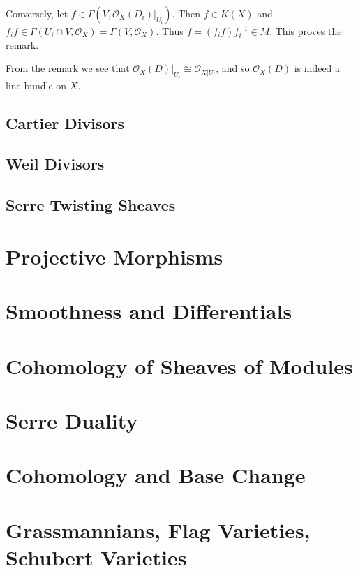 \documentclass[12pt]{book}
\theoremstyle{definition}
\begin{document}
	Conversely, let $f \in \Gamma(V, \mathcal{O}_X(D_i)|_{U_i})$. Then $f \in K(X)$ and $f_if \in \Gamma(U_i \cap V, \mathcal{O}_X) = \Gamma(V, \mathcal{O}_X)$. Thus $f = (f_if)f_i^{-1} \in M$. This proves the remark.
	
	From the remark we see that $\mathcal{O}_X(D)|_{U_i} \cong \mathcal{O}_{X|U_i}$, and so $\mathcal{O}_X(D)$ is indeed a line bundle on $X$.
	
	\section{Cartier Divisors}
	
	\section{Weil Divisors}
	
	\section{Serre Twisting Sheaves}
	
	\chapter{Projective Morphisms}
	
	\chapter{Smoothness and Differentials}
	
	
	
	\chapter{Cohomology of Sheaves of Modules}
	
	\chapter{Serre Duality}
	
	\chapter{Cohomology and Base Change}
	
	\chapter{Grassmannians, Flag Varieties, Schubert Varieties}
	
\end{document}
